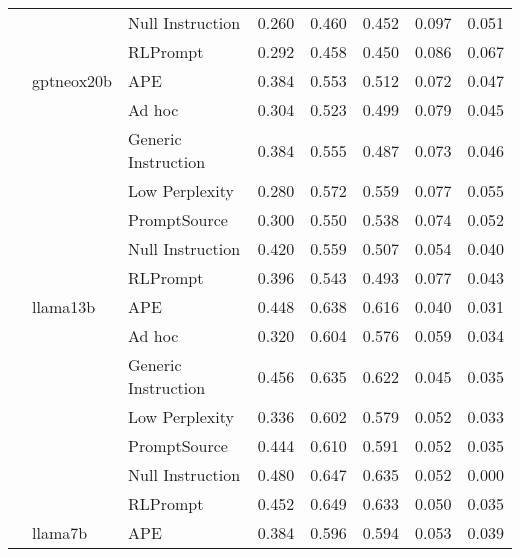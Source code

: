 \begin{supertabular}{lllrrrrr}
              &        & Null Instruction &            0.260 &           0.460 &          0.452 &        0.097 &    0.051 \\
              &        & RLPrompt &            0.292 &           0.458 &          0.450 &        0.086 &    0.067 \\
              & gptneox20b & APE &            0.384 &           0.553 &          0.512 &        0.072 &    0.047 \\
              &        & Ad hoc &            0.304 &           0.523 &          0.499 &        0.079 &    0.045 \\
              &        & Generic Instruction &            0.384 &           0.555 &          0.487 &        0.073 &    0.046 \\
              &        & Low Perplexity &            0.280 &           0.572 &          0.559 &        0.077 &    0.055 \\
              &        & PromptSource &            0.300 &           0.550 &          0.538 &        0.074 &    0.052 \\
              &        & Null Instruction &            0.420 &           0.559 &          0.507 &        0.054 &    0.040 \\
              &        & RLPrompt &            0.396 &           0.543 &          0.493 &        0.077 &    0.043 \\
              & llama13b & APE &            0.448 &           0.638 &          0.616 &        0.040 &    0.031 \\
              &        & Ad hoc &            0.320 &           0.604 &          0.576 &        0.059 &    0.034 \\
              &        & Generic Instruction &            0.456 &           0.635 &          0.622 &        0.045 &    0.035 \\
              &        & Low Perplexity &            0.336 &           0.602 &          0.579 &        0.052 &    0.033 \\
              &        & PromptSource &            0.444 &           0.610 &          0.591 &        0.052 &    0.035 \\
              &        & Null Instruction &            0.480 &           0.647 &          0.635 &        0.052 &      0.000 \\
              &        & RLPrompt &            0.452 &           0.649 &          0.633 &        0.050 &    0.035 \\
              & llama7b & APE &            0.384 &           0.596 &          0.594 &        0.053 &    0.039 \\

\end{supertabular}
